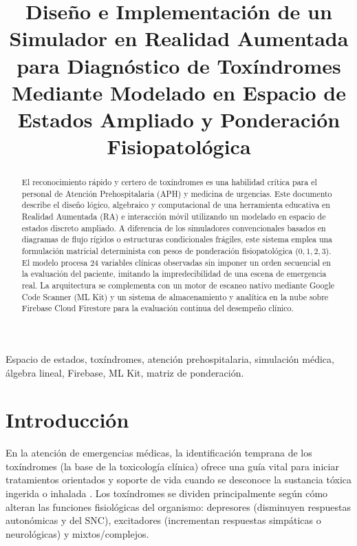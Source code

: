 \documentclass[conference,10pt,a4paper]{IEEEtran}
\begin{document}
\title{Diseño e Implementación de un Simulador en Realidad Aumentada para Diagnóstico de Toxíndromes Mediante Modelado en Espacio de Estados Ampliado y Ponderación Fisiopatológica}

\author{
}

\maketitle

\begin{abstract}
El reconocimiento rápido y certero de toxíndromes es una habilidad crítica para el personal de Atención Prehospitalaria (APH) y medicina de urgencias. Este documento describe el diseño lógico, algebraico y computacional de una herramienta educativa en Realidad Aumentada (RA) e interacción móvil utilizando un modelado en espacio de estados discreto ampliado. A diferencia de los simuladores convencionales basados en diagramas de flujo rígidos o estructuras condicionales frágiles, este sistema emplea una formulación matricial determinista con pesos de ponderación fisiopatológica ($0, 1, 2, 3$). El modelo procesa $24$ variables clínicas observadas sin imponer un orden secuencial en la evaluación del paciente, imitando la impredecibilidad de una escena de emergencia real. La arquitectura se complementa con un motor de escaneo nativo mediante Google Code Scanner (ML Kit) y un sistema de almacenamiento y analítica en la nube sobre Firebase Cloud Firestore para la evaluación continua del desempeño clínico.
\end{abstract}

\begin{IEEEkeywords}
Espacio de estados, toxíndromes, atención prehospitalaria, simulación médica, álgebra lineal, Firebase, ML Kit, matriz de ponderación.
\end{IEEEkeywords}

\section{Introducción}
En la atención de emergencias médicas, la identificación temprana de los toxíndromes (la base de la toxicología clínica) ofrece una guía vital para iniciar tratamientos orientados y soporte de vida cuando se desconoce la sustancia tóxica ingerida o inhalada \cite{erickson2021}. Los toxíndromes se dividen principalmente según cómo alteran las funciones fisiológicas del organismo: depresores (disminuyen respuestas autonómicas y del SNC), excitadores (incrementan respuestas simpáticas o neurológicas) y mixtos/complejos.
\end{document}
